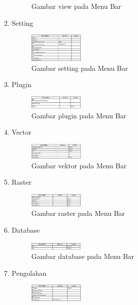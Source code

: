 \begin{enumerate}
\begin{figure}[ht]
    \caption{Gambar view pada Menu Bar}
    \label{menubar2}
    \end{figure}
\item
Setting
\begin{figure}[ht]
    \centerline{\includegraphics[width=0.25\textwidth]{figures/menubar3}}
    \caption{Gambar setting pada Menu Bar}
    \label{menubar3}
    \end{figure}
\item
Plugin
\begin{figure}[ht]
    \centerline{\includegraphics[width=0.25\textwidth]{figures/menubar4}}
    \caption{Gambar plugin pada Menu Bar}
    \label{menubar4}
    \end{figure}
\item
Vector
\begin{figure}[ht]
    \centerline{\includegraphics[width=0.25\textwidth]{figures/menubar5}}
    \caption{Gambar vektor pada Menu Bar}
    \label{menubar5}
    \end{figure}
\item
Raster
\begin{figure}[ht]
    \centerline{\includegraphics[width=0.25\textwidth]{figures/menubar6}}
    \caption{Gambar raster pada Menu Bar}
    \label{menubar6}
    \end{figure}
\item
Database
\begin{figure}[ht]
    \centerline{\includegraphics[width=0.25\textwidth]{figures/menubar7}}
    \caption{Gambar database pada Menu Bar}
    \label{menubar7}
    \end{figure}
\item
Pengolahan
\begin{figure}[ht]
    \centerline{\includegraphics[width=0.25\textwidth]{figures/menubar8}}

\end{figure}
\end{enumerate}
